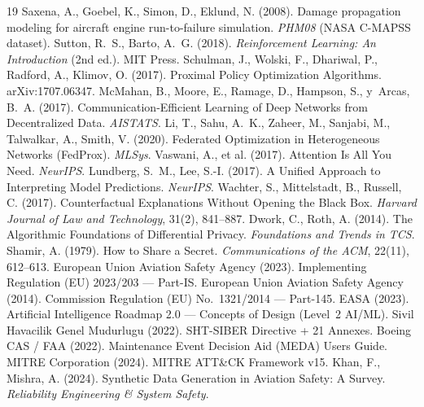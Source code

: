 \documentclass[11pt]{article}
\begin{document}
\begin{thebibliography}{19}\small
{} Saxena, A., Goebel, K., Simon, D., Eklund, N. (2008). Damage propagation modeling for aircraft engine run-to-failure simulation. \emph{PHM08} (NASA C-MAPSS dataset).
 Sutton, R.~S., Barto, A.~G. (2018). \emph{Reinforcement Learning: An Introduction} (2nd ed.). MIT Press.
 Schulman, J., Wolski, F., Dhariwal, P., Radford, A., Klimov, O. (2017). Proximal Policy Optimization Algorithms. arXiv:1707.06347.
 McMahan, B., Moore, E., Ramage, D., Hampson, S., y~Arcas, B.~A. (2017). Communication-Efficient Learning of Deep Networks from Decentralized Data. \emph{AISTATS}.
 Li, T., Sahu, A.~K., Zaheer, M., Sanjabi, M., Talwalkar, A., Smith, V. (2020). Federated Optimization in Heterogeneous Networks (FedProx). \emph{MLSys}.
 Vaswani, A., et al. (2017). Attention Is All You Need. \emph{NeurIPS}.
 Lundberg, S.~M., Lee, S.-I. (2017). A Unified Approach to Interpreting Model Predictions. \emph{NeurIPS}.
 Wachter, S., Mittelstadt, B., Russell, C. (2017). Counterfactual Explanations Without Opening the Black Box. \emph{Harvard Journal of Law and Technology}, 31(2), 841--887.
 Dwork, C., Roth, A. (2014). The Algorithmic Foundations of Differential Privacy. \emph{Foundations and Trends in TCS}.
 Shamir, A. (1979). How to Share a Secret. \emph{Communications of the ACM}, 22(11), 612--613.
 European Union Aviation Safety Agency (2023). Implementing Regulation (EU) 2023/203 --- Part-IS.
 European Union Aviation Safety Agency (2014). Commission Regulation (EU) No.~1321/2014 --- Part-145.
 EASA (2023). Artificial Intelligence Roadmap 2.0 --- Concepts of Design (Level~2 AI/ML).
 Sivil Havacilik Genel Mudurlugu (2022). SHT-SIBER Directive + 21 Annexes.
 Boeing CAS / FAA (2022). Maintenance Event Decision Aid (MEDA) Users Guide.
 MITRE Corporation (2024). MITRE ATT\&CK Framework v15.
 Khan, F., Mishra, A. (2024). Synthetic Data Generation in Aviation Safety: A Survey. \emph{Reliability Engineering \& System Safety}.
\end{thebibliography}
\end{document}
